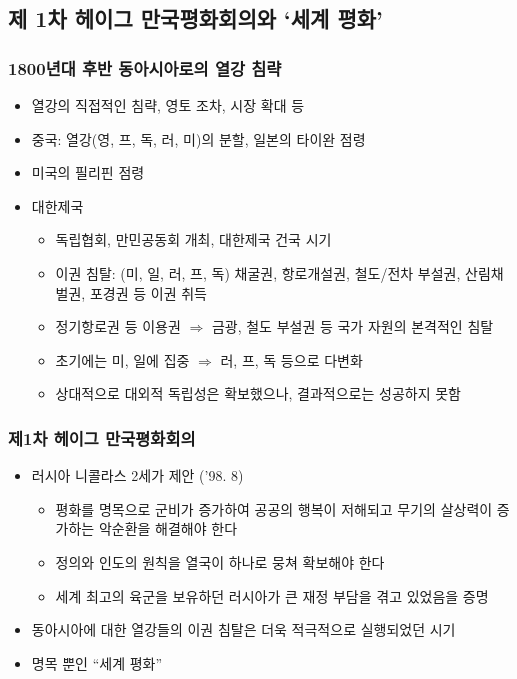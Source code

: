 \subsection{제 1차 헤이그 만국평화회의와 `세계 평화'}

\subsubsection*{1800년대 후반 동아시아로의 열강 침략}

\begin{itemize}
    \item 열강의 직접적인 침략, 영토 조차, 시장 확대 등
    \item 중국: 열강(영, 프, 독, 러, 미)의 분할, 일본의 타이완 점령
    \item 미국의 필리핀 점령
    \item 대한제국
    \begin{itemize}
        \item 독립협회, 만민공동회 개최, 대한제국 건국 시기
        \item 이권 침탈: (미, 일, 러, 프, 독) 채굴권, 항로개설권, 철도/전차 부설권, 산림채벌권, 포경권 등 이권 취득
        \item 정기항로권 등 이용권 $\Rightarrow$ 금광, 철도 부설권 등 국가 자원의 본격적인 침탈
        \item 초기에는 미, 일에 집중 $\Rightarrow$ 러, 프, 독 등으로 다변화
        \item 상대적으로 대외적 독립성은 확보했으나, 결과적으로는 성공하지 못함
    \end{itemize}
\end{itemize}

\subsubsection*{제1차 헤이그 만국평화회의}

\begin{itemize}
    \item 러시아 니콜라스 2세가 제안 ('98. 8)
    \begin{itemize}
        \item 평화를 명목으로 군비가 증가하여 공공의 행복이 저해되고 무기의 살상력이 증가하는 악순환을 해결해야 한다
        \item 정의와 인도의 원칙을 열국이 하나로 뭉쳐 확보해야 한다
        \item 세계 최고의 육군을 보유하던 러시아가 큰 재정 부담을 겪고 있었음을 증명
    \end{itemize}
    \item 동아시아에 대한 열강들의 이권 침탈은 더욱 적극적으로 실행되었던 시기
    \item 명목 뿐인 ``세계 평화''
\end{itemize}
